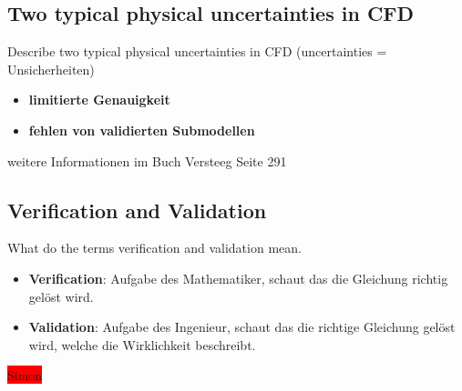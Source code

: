 \documentclass[a4paper]{scrartcl}
\begin{document}
\subsection{Two typical physical uncertainties in CFD}
Describe two typical physical uncertainties in CFD (uncertainties =
Unsicherheiten)
\begin{itemize}
\item \textbf{limitierte Genauigkeit}
\item \textbf{fehlen von validierten Submodellen}
\end{itemize}
weitere Informationen im Buch Versteeg Seite 291

\subsection{Verification and Validation} 
What do the terms verification and
validation mean.
\begin{itemize}
\item \textbf{Verification}: Aufgabe des Mathematiker, schaut das die Gleichung richtig gelöst wird.
\item \textbf{Validation}: Aufgabe des Ingenieur, schaut das die richtige Gleichung gelöst wird, welche die Wirklichkeit beschreibt.
\end{itemize}


\colorbox{red}{Simon}
\end{document}
